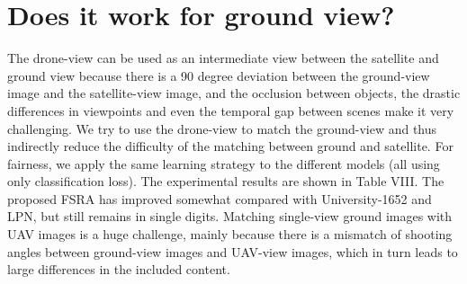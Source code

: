 \documentclass[lettersize,journal]{IEEEtran}
\begin{document}
{\appendices

\begin{table}[h]
\renewcommand\arraystretch{1.5}
\caption{The models were trained on ground, drone and satellite views, and the accuracy of matching between ground and drone views was tested. Where G refers to ground-view and D refers to drone-view.}
\label{table8}
\end{table}

\section{Does it work for ground view?}
The drone-view can be used as an intermediate view between the satellite and ground view because there is a 90 degree deviation between the ground-view image and the satellite-view image, and the occlusion between objects, the drastic differences in viewpoints and even the temporal gap between scenes make it very challenging. We try to use the drone-view to match the ground-view and thus indirectly reduce the difficulty of the matching between ground and satellite. For fairness, we apply the same learning strategy to the different models (all using only classification loss). The experimental results are shown in Table VIII. The proposed FSRA has improved somewhat compared with University-1652 and LPN, but still remains in single digits. Matching single-view ground images with UAV images is a huge challenge, mainly because there is a mismatch of shooting angles between ground-view images and UAV-view images, which in turn leads to large differences in the included content.

}
\end{document}
